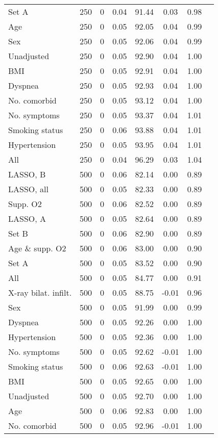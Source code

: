 \documentclass{article}
\begin{document}
{\begin{longtable}{lccccccc}
Set A & 250 & 0 & 0.04 & 91.44 & 0.03 & 0.98\\
Age & 250 & 0 & 0.05 & 92.05 & 0.04 & 0.99\\
Sex & 250 & 0 & 0.05 & 92.06 & 0.04 & 0.99\\
Unadjusted & 250 & 0 & 0.05 & 92.90 & 0.04 & 1.00\\
BMI & 250 & 0 & 0.05 & 92.91 & 0.04 & 1.00\\
Dyspnea & 250 & 0 & 0.05 & 92.93 & 0.04 & 1.00\\
No. comorbid & 250 & 0 & 0.05 & 93.12 & 0.04 & 1.00\\
No. symptoms & 250 & 0 & 0.05 & 93.37 & 0.04 & 1.01\\
Smoking status & 250 & 0 & 0.06 & 93.88 & 0.04 & 1.01\\
Hypertension & 250 & 0 & 0.05 & 93.95 & 0.04 & 1.01\\
All & 250 & 0 & 0.04 & 96.29 & 0.03 & 1.04\\ \midrule
LASSO, B & 500 & 0 & 0.06 & 82.14 & 0.00 & 0.89\\
LASSO, all & 500 & 0 & 0.05 & 82.33 & 0.00 & 0.89\\
Supp. O2 & 500 & 0 & 0.06 & 82.52 & 0.00 & 0.89\\
LASSO, A & 500 & 0 & 0.05 & 82.64 & 0.00 & 0.89\\
Set B & 500 & 0 & 0.06 & 82.90 & 0.00 & 0.89\\
Age \& supp. O2 & 500 & 0 & 0.06 & 83.00 & 0.00 & 0.90\\
Set A & 500 & 0 & 0.05 & 83.52 & 0.00 & 0.90\\
All & 500 & 0 & 0.05 & 84.77 & 0.00 & 0.91\\
X-ray bilat. infilt. & 500 & 0 & 0.05 & 88.75 & -0.01 & 0.96\\
Sex & 500 & 0 & 0.05 & 91.99 & 0.00 & 0.99\\
Dyspnea & 500 & 0 & 0.05 & 92.26 & 0.00 & 1.00\\
Hypertension & 500 & 0 & 0.05 & 92.36 & 0.00 & 1.00\\
No. symptoms & 500 & 0 & 0.05 & 92.62 & -0.01 & 1.00\\
Smoking status & 500 & 0 & 0.06 & 92.63 & -0.01 & 1.00\\
BMI & 500 & 0 & 0.05 & 92.65 & 0.00 & 1.00\\
Unadjusted & 500 & 0 & 0.05 & 92.70 & 0.00 & 1.00\\
Age & 500 & 0 & 0.06 & 92.83 & 0.00 & 1.00\\
No. comorbid & 500 & 0 & 0.05 & 92.96 & -0.01 & 1.00\\ \midrule

\end{longtable}}
\end{document}
